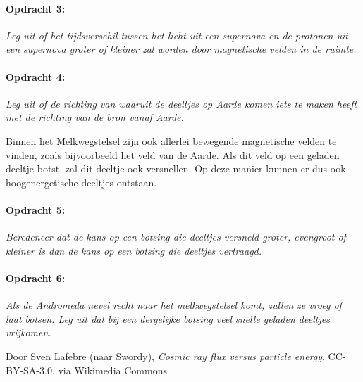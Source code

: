 \paragraph*{Opdracht 3:}

\emph{Leg uit of het tijdsverschil tussen het licht uit een supernova
en de protonen uit een supernova groter of kleiner zal worden door
magnetische velden in de ruimte.}


\paragraph*{Opdracht 4:}

\emph{Leg uit of de richting van waaruit de deeltjes op Aarde komen
iets te maken heeft met de richting van de bron vanaf Aarde.}

Binnen het Melkwegstelsel zijn ook allerlei bewegende magnetische
velden te vinden, zoals bijvoorbeeld het veld van de Aarde. Als dit
veld op een geladen deeltje botst, zal dit deeltje ook versnellen.
Op deze manier kunnen er dus ook hoogenergetische deeltjes ontstaan.


\paragraph*{Opdracht 5:}

\emph{Beredeneer dat de kans op een botsing die deeltjes versneld
groter, evengroot of kleiner is dan de kans op een botsing die deeltjes
vertraagd.}


\paragraph*{Opdracht 6:}

\emph{Als de Andromeda nevel recht naar het melkwegstelsel komt, zullen
ze vroeg of laat botsen. Leg uit dat bij een dergelijke botsing veel
snelle geladen deeltjes vrijkomen.}


\begin{thebibliography}{9}
        Door Sven Lafebre (naar Swordy), \emph{Cosmic ray flux versus particle energy}, CC-BY-SA-3.0, via Wikimedia Commons
\end{thebibliography}


